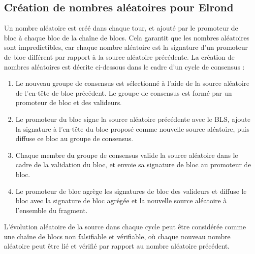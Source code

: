 \documentclass[journal]{IEEEtran}
\begin{document}
\subsection{Création de nombres aléatoires pour Elrond}
Un nombre aléatoire est créé dans chaque tour, et ajouté par le promoteur de bloc à chaque bloc de la chaîne  de blocs. Cela garantit que les nombres aléatoires sont impredictibles, car chaque nombre aléatoire est la signature d'un promoteur de bloc différent par rapport à la source aléatoire précédente. La création de nombres aléatoires est décrite ci-dessous dans le cadre d'un cycle de consensus :
\begin{enumerate}
  \item Le nouveau groupe de consensus est sélectionné à l'aide de la source aléatoire de l'en-tête de bloc précédent. Le groupe de consensus est formé par un promoteur de bloc et des valideurs.
  \item Le promoteur du bloc signe la source aléatoire précédente avec le BLS, ajoute la signature à l'en-tête du bloc proposé comme nouvelle source aléatoire, puis diffuse ce bloc au groupe de consensus.
  \item Chaque membre du groupe de consensus valide la source aléatoire dans le cadre de la validation du bloc, et envoie sa signature de bloc au promoteur de bloc.
  \item Le promoteur de bloc agrège les signatures de bloc des valideurs et diffuse le bloc avec la signature de bloc agrégée et la nouvelle source aléatoire à l'ensemble du fragment.
\end{enumerate}
  
L'évolution aléatoire de la source dans chaque cycle peut être considérée comme une chaîne  de blocs non falsifiable et vérifiable, où chaque nouveau nombre aléatoire peut être lié et vérifié par rapport au nombre aléatoire précédent.
\end{document}
